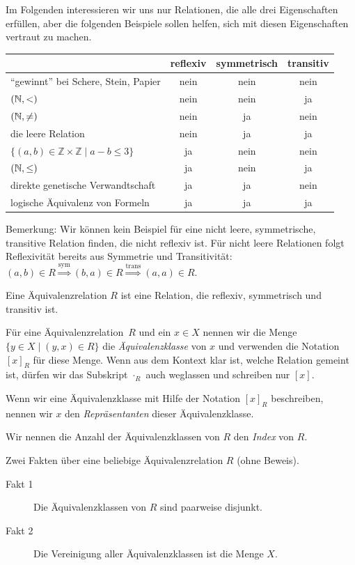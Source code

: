 \begin{Bsp} Im Folgenden interessieren wir uns nur Relationen, die alle drei Eigenschaften erfüllen, 
aber die folgenden Beispiele sollen helfen, sich mit diesen Eigenschaften vertraut zu machen.

\begin{center}
\begin{tabular}{lccc}
& reflexiv & symmetrisch & transitiv\\ \hline
"`gewinnt"' bei Schere, Stein, Papier & nein & nein & nein\\
$(\mathbb{N}, <)$ & nein & nein & ja\\
$(\mathbb{N}, \neq)$ & nein & ja & nein\\
die leere Relation & nein & ja & ja\\
$\{(a,b)\in\mathbb{Z}\times\mathbb{Z}\mid a-b\leq 3\}$ & ja & nein & nein\\
$(\mathbb{N}, \leq)$& ja & nein & ja\\
direkte genetische Verwandtschaft & ja & ja & nein\\
logische Äquivalenz von Formeln & ja & ja & ja
\end{tabular}
\end{center}
Bemerkung: Wir können kein Beispiel für eine nicht leere, symmetrische, transitive Relation finden, die nicht reflexiv ist.
Für nicht leere Relationen folgt Reflexivität bereits aus Symmetrie und Transitivität: 
$(a,b)\in R\stackrel{\text{sym}}{\Rightarrow} (b,a)\in R\stackrel{\text{trans}}{\Rightarrow} (a,a)\in R$.
\end{Bsp}

\begin{Def}
Eine Äquivalenzrelation $R$ ist eine Relation, die reflexiv, symmetrisch und transitiv ist.

Für eine Äquivalenzrelation~$R$ und ein $x\in X$ nennen wir die Menge $\{y\in X \mid (y, x) \in R\}$ die \emph{Äquivalenzklasse} von $x$
und verwenden die Notation $[x]_R$ für diese Menge.
Wenn aus dem Kontext klar ist, welche Relation gemeint ist, dürfen wir das Subskript $\cdot_R$ auch weglassen und schreiben nur $[x]$.

Wenn wir eine Äquivalenzklasse mit Hilfe der Notation $[x]_R$ beschreiben, nennen wir $x$ den \emph{Repräsentanten} dieser Äquivalenzklasse.

Wir nennen die Anzahl der Äquivalenzklassen von $R$ den \emph{Index} von $R$.
\end{Def}

Zwei Fakten über eine beliebige Äquivalenzrelation $R$ (ohne Beweis).
\begin{description}
 \item[Fakt 1] Die Äquivalenzklassen von $R$ sind paarweise disjunkt.
 \item[Fakt 2] Die Vereinigung aller Äquivalenzklassen ist die Menge $X$.
\end{description}

